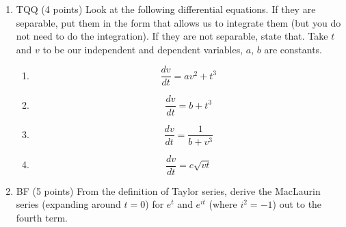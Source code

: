 \documentclass[12pt]{article}
\begin{document}
\begin{enumerate}
\begin{enumerate}
  \end{enumerate}





  \clearpage
  \item	TQQ (4 points) Look at the following differential equations.  If they are separable, put them in the form that allows us to integrate them (but you do not need to do the integration).  If they are not separable, state that.  Take $t$ and $v$ to be our independent and dependent variables, $a$, $b$  are constants.
  \begin{enumerate}
    \item $$\frac{dv}{dt} = av^2 + t^3$$
    \item $$\frac{dv}{dt} = b + t^3$$
    \item $$\frac{dv}{dt} = \frac{1}{b + v^3}$$
    \item $$\frac{dv}{dt} = c\sqrt{vt}$$
  \end{enumerate}


\item BF (5 points) From the definition of Taylor series, derive the MacLaurin series (expanding around $t=0$) for $e^t$  and $e^{it}$ (where $i^2=-1$) out to the fourth term.



\end{enumerate}
\end{document}
